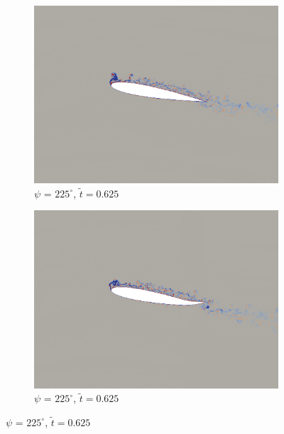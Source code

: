 \begin{figure}[H]
	
	\begin{subfigure}[b]{0.4\textwidth}
		\centering
		\includegraphics[width=1\textwidth]{figures/mu_1pt5/vorticity/baseline/phase_225.png}
		\caption{ $\psi$ = $225^\circ$, $\tilde{t}=0.625$}
		\label{fig:mu_1pt5_baseline_psi225}
	\end{subfigure}
	\begin{subfigure}[b]{0.4\textwidth}
		\centering
		\includegraphics[width=1\textwidth]{figures/mu_1pt5/vorticity/AC/phase_225.png}
		\caption{ $\psi$ = $225^\circ$,  $\tilde{t}=0.625$}
		\label{fig:mu_1pt5_AC_psi225}
	\end{subfigure}
	

\end{figure}
